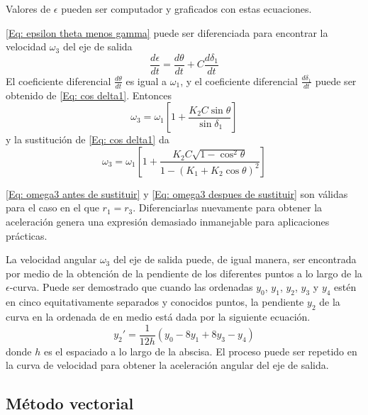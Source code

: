 \documentclass[12pt, final]{extarticle}
\begin{document}
Valores de $\epsilon$ pueden ser computador y graficados con estas ecuaciones.

\eqref{Eq: epsilon theta menos gamma} puede ser diferenciada para encontrar la
velocidad $\omega_{3}$ del eje de salida
\begin{equation*}
    \frac{d\epsilon}{dt} = \frac{d\theta}{dt} + C\frac{d\delta_{1}}{dt}
\end{equation*}
El coeficiente diferencial $\frac{d\theta}{dt}$ es igual a $\omega_{1}$, y el
coeficiente diferencial $\frac{d\delta_{1}}{dt}$ puede ser obtenido de
\eqref{Eq: cos delta1}. Entonces
\begin{equation}
    \omega_{3} = \omega_{1} \left[
        1 + \frac{K_{2}C\sin\theta}{\sin\delta_{1}}
    \right]
    \label{Eq: omega3 antes de sustituir}
\end{equation}
y la sustitución de \eqref{Eq: cos delta1} da
\begin{equation}
    \omega_{3} = \omega_{1} \left[
        1 + \frac{K_{2}C\sqrt{1-\cos^2\theta}}{1-(K_{1} + K_{2}\cos\theta)^2}
    \right]
    \label{Eq: omega3 despues de sustituir}
\end{equation}

\eqref{Eq: omega3 antes de sustituir} y \eqref{Eq: omega3 despues de sustituir}
son válidas para el caso en el que $r_{1} = r_{3}$. Diferenciarlas nuevamente
para obtener la aceleración genera una expresión demasiado inmanejable para
aplicaciones prácticas.

La velocidad angular $\omega_{3}$ del eje de salida puede, de igual manera, ser
encontrada por medio de la obtención de la pendiente de los diferentes puntos a
lo largo de la $\epsilon$-curva. Puede ser demostrado\cite{Milne1949} que
cuando las ordenadas $y_{0}$, $y_{1}$, $y_{2}$, $y_{3}$ y $y_{4}$ estén en cinco
equitativamente separados y conocidos puntos, la pendiente $y_{2}$ de la curva
en la ordenada de en medio está dada por la siguiente ecuación.
\begin{equation}
    {y_{2}}' = \frac{1}{12h}(y_{0} - 8y_{1} + 8y_{3} - y_{4})
\end{equation}
donde $h$ es el espaciado a lo largo de la abscisa. El proceso puede ser
repetido en la curva de velocidad para obtener la aceleración angular del eje de
salida.

\newpage
\subsection{Método vectorial}
\end{document}
